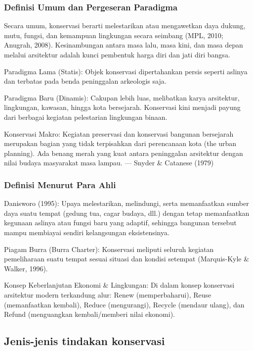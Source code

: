 \documentclass[../rumukota.tex]{subfiles}
\begin{document}
\subsubsection{Definisi Umum dan Pergeseran Paradigma}%
\label{ssub:Definisi Umum dan Pergeseran Paradigma}


Secara umum, konservasi berarti melestarikan atau mengawetkan daya dukung, mutu, fungsi, dan kemampuan lingkungan secara seimbang (MPL, 2010; Anugrah, 2008). Kesinambungan antara masa lalu, masa kini, dan masa depan melalui arsitektur adalah kunci pembentuk harga diri dan jati diri bangsa.

Paradigma Lama (Statis): Objek konservasi dipertahankan persis seperti aslinya dan terbatas pada benda peninggalan arkeologis saja.

Paradigma Baru (Dinamis): Cakupan lebih luas, melibatkan karya arsitektur, lingkungan, kawasan, hingga kota bersejarah. Konservasi kini menjadi payung dari berbagai kegiatan pelestarian lingkungan binaan.

Konservasi Makro:
Kegiatan preservasi dan konservasi bangunan bersejarah merupakan bagian yang tidak terpisahkan dari perencanaan kota (the urban planning). Ada benang merah yang kuat antara peninggalan arsitektur dengan nilai budaya masyarakat masa lampau.
— Snyder \& Catanese (1979)

\subsubsection{Definisi Menurut Para Ahli}%
\label{ssub:definisi_menurut_para_ahli}

Danisworo (1995): Upaya melestarikan, melindungi, serta memanfaatkan sumber daya suatu tempat (gedung tua, cagar budaya, dll.) dengan tetap memanfaatkan kegunaan aslinya atau fungsi baru yang adaptif, sehingga bangunan tersebut mampu membiayai sendiri kelangsungan eksistensinya.

Piagam Burra (Burra Charter): Konservasi meliputi seluruh kegiatan pemeliharaan suatu tempat sesuai situasi dan kondisi setempat (Marquis-Kyle \& Walker, 1996).

Konsep Keberlanjutan Ekonomi \& Lingkungan: Di dalam konsep konservasi arsitektur modern terkandung alur: Renew (memperbaharui), Reuse (memanfaatkan kembali), Reduce (mengurangi), Recycle (mendaur ulang), dan Refund (menguangkan kembali/memberi nilai ekonomi).

\subsection{Jenis-jenis tindakan konservasi}%
\label{sub:Jenis-jenis tindakan konservasi}
\end{document}
